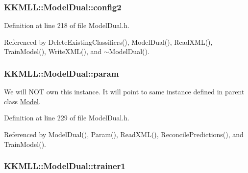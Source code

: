 \subsubsection[{\texorpdfstring{config2}{config2}}]{ K\+K\+M\+L\+L\+::\+Model\+Dual\+::config2\hspace{0.3cm}{\ttfamily [protected]}}\hypertarget{class_k_k_m_l_l_1_1_model_dual_ae3a785cf1484bb40abe8d090312e6061}{}\label{class_k_k_m_l_l_1_1_model_dual_ae3a785cf1484bb40abe8d090312e6061}


Definition at line 218 of file Model\+Dual.\+h.



Referenced by Delete\+Existing\+Classifiers(), Model\+Dual(), Read\+X\+M\+L(), Train\+Model(), Write\+X\+M\+L(), and $\sim$\+Model\+Dual().

\subsubsection[{\texorpdfstring{param}{param}}]{ K\+K\+M\+L\+L\+::\+Model\+Dual\+::param\hspace{0.3cm}{\ttfamily [protected]}}\hypertarget{class_k_k_m_l_l_1_1_model_dual_ac78b32cfbe102267574423e84aba9e42}{}\label{class_k_k_m_l_l_1_1_model_dual_ac78b32cfbe102267574423e84aba9e42}
We will N\+OT own this instance. It will point to same instance defined in parent class \hyperlink{class_k_k_m_l_l_1_1_model}{Model}. 

Definition at line 229 of file Model\+Dual.\+h.



Referenced by Model\+Dual(), Param(), Read\+X\+M\+L(), Reconcile\+Predictions(), and Train\+Model().

\subsubsection[{\texorpdfstring{trainer1}{trainer1}}]{ K\+K\+M\+L\+L\+::\+Model\+Dual\+::trainer1\hspace{0.3cm}{\ttfamily [protected]}}\hypertarget{class_k_k_m_l_l_1_1_model_dual_ac70e06e4290a0eca3cb79892170fdf6c}{}\label{class_k_k_m_l_l_1_1_model_dual_ac70e06e4290a0eca3cb79892170fdf6c}


